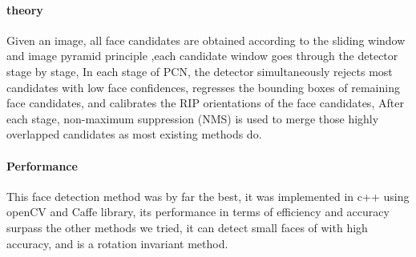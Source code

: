 \paragraph{theory}
Given an image, all face candidates are obtained according to the sliding window and image pyramid principle ,each candidate window goes through the detector stage by stage, In each stage of PCN, the detector simultaneously rejects most candidates with low face confidences, regresses the bounding boxes of remaining face candidates, and calibrates the RIP orientations of the face candidates, After each stage, non-maximum suppression (NMS) is used to merge those highly overlapped candidates as most existing methods do.
\paragraph{Performance}
This face detection method was by far the best, it was implemented in c++ using openCV and Caffe library, its performance in terms of efficiency and accuracy surpass the other methods we tried, it can detect small faces of with high accuracy, and is a rotation invariant method.

